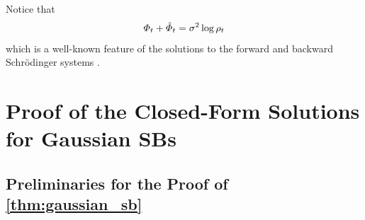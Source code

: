Notice that
\begin{align}
\Phi_{t} + \hat{\Phi}_{t} = \sigma^2 \log \rho_{t}
\end{align}which is a well-known feature of the solutions to the forward and backward Schr\"odinger systems \citep{chen2021stochastic,leonard2013survey}.

\newpage
\section{Proof of the Closed-Form Solutions for Gaussian SBs}
\label{app:gaussian_sb}


\subsection{Preliminaries for the Proof of \cref{thm:gaussian_sb}}
\label{app:prelimproof_gsb}


